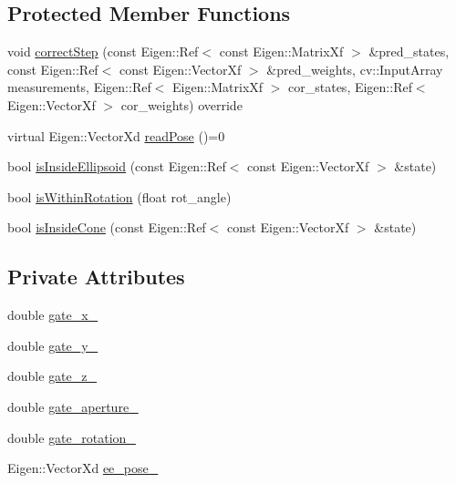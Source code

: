 \subsection*{Protected Member Functions}
\begin{DoxyCompactItemize}
\item 
void \hyperlink{classGatePose_a91d395abe75dc7772116f50219dc19ae}{correct\+Step} (const Eigen\+::\+Ref$<$ const Eigen\+::\+Matrix\+Xf $>$ \&pred\+\_\+states, const Eigen\+::\+Ref$<$ const Eigen\+::\+Vector\+Xf $>$ \&pred\+\_\+weights, cv\+::\+Input\+Array measurements, Eigen\+::\+Ref$<$ Eigen\+::\+Matrix\+Xf $>$ cor\+\_\+states, Eigen\+::\+Ref$<$ Eigen\+::\+Vector\+Xf $>$ cor\+\_\+weights) override
\item 
virtual Eigen\+::\+Vector\+Xd \hyperlink{classGatePose_aed9235df850c3ca930f9e43276bf4f62}{read\+Pose} ()=0
\item 
bool \hyperlink{classGatePose_a880273787b1b3542e1e7971954ac118d}{is\+Inside\+Ellipsoid} (const Eigen\+::\+Ref$<$ const Eigen\+::\+Vector\+Xf $>$ \&state)
\item 
bool \hyperlink{classGatePose_a6d188756ed5dcc56c311a2aafc9d1acd}{is\+Within\+Rotation} (float rot\+\_\+angle)
\item 
bool \hyperlink{classGatePose_ad2e8708b3ed5a8252bdec1494f199fda}{is\+Inside\+Cone} (const Eigen\+::\+Ref$<$ const Eigen\+::\+Vector\+Xf $>$ \&state)
\end{DoxyCompactItemize}
\subsection*{Private Attributes}
\begin{DoxyCompactItemize}
\item 
double \hyperlink{classGatePose_a702b2c10eb1d86b9a0ac139b3f894310}{gate\+\_\+x\+\_\+}
\item 
double \hyperlink{classGatePose_a844864ec9133c4c2081b3682ca243cac}{gate\+\_\+y\+\_\+}
\item 
double \hyperlink{classGatePose_a1ff2edfa464cfe7efc8c1da43f59de21}{gate\+\_\+z\+\_\+}
\item 
double \hyperlink{classGatePose_ac5e580554426053ea164e00fbe41f775}{gate\+\_\+aperture\+\_\+}
\item 
double \hyperlink{classGatePose_a98dd62845368c46900f7cf0dcac358e5}{gate\+\_\+rotation\+\_\+}
\item 
Eigen\+::\+Vector\+Xd \hyperlink{classGatePose_affa53c9f133bf1dd59de8880317cf3cd}{ee\+\_\+pose\+\_\+}
\end{DoxyCompactItemize}



